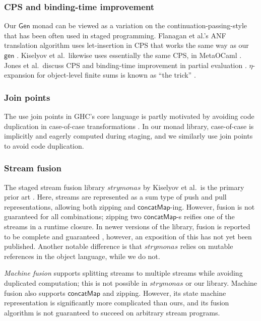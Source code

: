\documentclass[acmsmall,screen,review,anonymous]{acmart}
\newcommand{\mit}[1]{{\mathsf{#1}}}
\newcommand{\msf}[1]{{\mathsf{#1}}}
\newcommand{\concatMap}{\msf{concatMap}}
\theoremstyle{remark}
\newcommand{\Gen}{\msf{Gen}}
\newcommand{\gen}{\mit{gen}}
\begin{document}
\subsubsection*{CPS and binding-time improvement}
Our $\Gen$ monad can be viewed as a variation on the continuation-passing-style
that has been often used in staged programming. Flanagan et al.'s ANF
translation algorithm uses let-insertion in CPS that works the same way as our
$\gen$ \cite{DBLP:conf/pldi/FlanaganSDF93}. Kiselyov et al.\ likewise uses
essentially the same CPS, in MetaOCaml
\cite{DBLP:conf/popl/KiselyovBPS17}. Jones et al.\ discuss CPS and binding-time
improvement in partial evaluation \cite{partial-evaluation}. $\eta$-expansion
for object-level finite sums is known as ``the trick'' \cite{eta-expansion-trick}.

\subsubsection*{Join points}
The use join points in GHC's core language is partly motivated by avoiding code
duplication in case-of-case transformations
\cite{DBLP:conf/pldi/MaurerDAJ17}. In our monad library, case-of-case is
implicitly and eagerly computed during staging, and we similarly use join points
to avoid code duplication.

\subsubsection*{Stream fusion}
The staged stream fusion library $\mathit{strymonas}$ by Kiselyov et al.\ is the
primary prior art \cite{DBLP:conf/popl/KiselyovBPS17}. Here, streams are represented as a sum type of
push and pull representations, allowing both zipping and
$\concatMap$-ing. However, fusion is not guaranteed for all combinations;
zipping two $\concatMap$-s reifies one of the streams in a runtime closure. In
newer versions of the library, fusion is reported to be complete and guaranteed
\cite{DBLP:conf/pepm/0001K24}, however, an exposition of this has not yet been published. Another
notable difference is that $\mathit{strymonas}$ relies on mutable references in
the object language, while we do not.

\emph{Machine fusion} \cite{DBLP:conf/ppdp/RobinsonL17} supports splitting
streams to multiple streams while avoiding duplicated computation; this is not
possible in $\mathit{strymonas}$ or our library. Machine fusion also supports
$\concatMap$ and zipping. However, its state machine representation is
significantly more complicated than ours, and its fusion algorithm is not
guaranteed to succeed on arbitrary stream programs.
\end{document}
